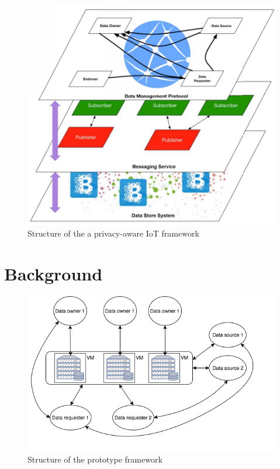 \documentclass[conference]{IEEEtran}
\begin{document}
\begin{figure}[t]
	\includegraphics[width=0.95\linewidth]{campbell_framework.png}
	\caption{Structure of the a privacy-aware IoT framework}
	\label{fig:framework_campbell}
\end{figure}

\section{Background}


\begin{figure}[t]
	\includegraphics[width=0.95\linewidth]{mid_sem_graphic.png}
	\caption{Structure of the prototype framework}
	\label{fig:framework}
\end{figure}
\end{document}
